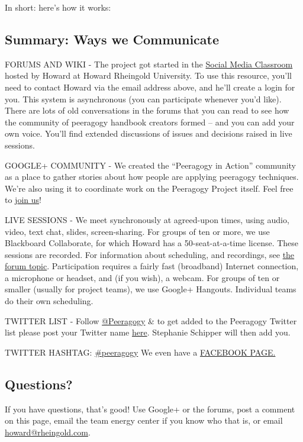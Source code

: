 In short: here's how it works:



\subsection{Summary: Ways we Communicate}

FORUMS AND WIKI - The project got started in the
\href{http://socialmediaclassroom.com/host/peeragogy/wiki/main-page}{Social
Media Classroom} hosted by Howard at Howard Rheingold University. To use
this resource, you'll need to contact Howard via the email address
above, and he'll create a login for you. This system is asynchronous
(you can participate whenever you'd like). There are lots of old
conversations in the forums that you can read to see how the community
of peeragogy handbook creators formed -- and you can add your own voice.
You'll find extended discussions of issues and decisions raised in live
sessions.

GOOGLE+ COMMUNITY - We created the ``Peeragogy in Action'' community as
a place to gather stories about how people are applying peeragogy
techniques. We're also using it to coordinate work on the Peeragogy
Project itself. Feel free to
j\href{https://plus.google.com/u/0/communities/107386162349686249470}{oin
us}!

LIVE SESSIONS - We meet synchronously at agreed-upon times, using audio,
video, text chat, slides, screen-sharing. For groups of ten or more, we
use Blackboard Collaborate, for which Howard has a 50-seat-at-a-time
license. These sessions are recorded. For information about scheduling,
and recordings, see
\href{http://socialmediaclassroom.com/host/peeragogy/forum/live-sessions-schedule-recordings-notes-mindmaps}{the
forum topic}. Participation requires a fairly fast (broadband) Internet
connection, a microphone or headset, and (if you wish), a webcam. For
groups of ten or smaller (usually for project teams), we use Google+
Hangouts. Individual teams do their own scheduling.

TWITTER LIST - Follow \href{http://twitter.com/Peeragogy/}{@Peeragogy}
\& to get added to the Peeragogy Twitter list please post your Twitter
name
\href{http://socialmediaclassroom.com/host/peeragogy/forum/the-tools-we-are-using-and-how-access-them}{here}.
Stephanie Schipper will then add you.

TWITTER HASHTAG:
\href{http://twitter.com/search?q=\%23peeragogy\&src=typd}{\#peeragogy}
We even have a \href{https://www.facebook.com/peeragogy}{FACEBOOK PAGE.}



\subsection{Questions?}

If you have questions, that's good! Use Google+ or the forums, post a
comment on this page, email the team energy center if you know who that
is, or email \href{mailto:howard@rheingold.com}{howard@rheingold.com}.
